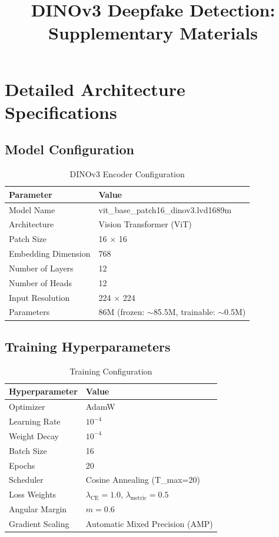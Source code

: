 \documentclass[11pt,a4paper]{article}
\title{DINOv3 Deepfake Detection: Supplementary Materials}
\author{}
\date{}
\begin{document}
\maketitle

\section{Detailed Architecture Specifications}

\subsection{Model Configuration}

\begin{table}[h]
\centering
\caption{DINOv3 Encoder Configuration}
\begin{tabular}{ll}
\toprule
\textbf{Parameter} & \textbf{Value} \\
\midrule
Model Name & vit\_base\_patch16\_dinov3.lvd1689m \\
Architecture & Vision Transformer (ViT) \\
Patch Size & 16 $\times$ 16 \\
Embedding Dimension & 768 \\
Number of Layers & 12 \\
Number of Heads & 12 \\
Input Resolution & 224 $\times$ 224 \\
Parameters & 86M (frozen: $\sim$85.5M, trainable: $\sim$0.5M) \\
\bottomrule
\end{tabular}
\end{table}

\subsection{Training Hyperparameters}

\begin{table}[h]
\centering
\caption{Training Configuration}
\begin{tabular}{ll}
\toprule
\textbf{Hyperparameter} & \textbf{Value} \\
\midrule
Optimizer & AdamW \\
Learning Rate & $10^{-4}$ \\
Weight Decay & $10^{-4}$ \\
Batch Size & 16 \\
Epochs & 20 \\
Scheduler & Cosine Annealing (T\_max=20) \\
Loss Weights & $\lambda_{\text{CE}}=1.0$, $\lambda_{\text{metric}}=0.5$ \\
Angular Margin & $m=0.6$ \\
Gradient Scaling & Automatic Mixed Precision (AMP) \\
\bottomrule
\end{tabular}
\end{table}
\end{document}
